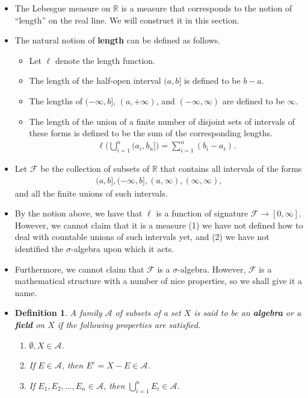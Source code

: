 \documentclass[10pt]{article}
\newtheorem{definition}[lemma]{Definition}
\newcommand{\mcal}[1]{\mathcal{#1}}
\newcommand{\Real}{\mathbb{R}}
\begin{document}
\begin{itemize}
  \item The Lebesgue measure on $\Real$ is a measure that corresponds to the notion of ``length'' on the real line. We will construct it in this section.
  
  \item The natural notion of {\bf length} can be defined as follows.
  \begin{itemize}
    \item Let $\ell$ denote the length function.
    \item The length of the half-open interval $(a,b]$ is defined to be $b - a$. 
    \item The lengths of $(-\infty, b]$, $(a, +\infty)$, and $(-\infty, \infty)$ are defined to be $\infty$.
    \item The length of the union of a finite number of disjoint sets of intervals of these forms is defined to be the sum of the corresponding lengths.
    \begin{align*}
      \ell \bigg( \bigcup_{i=1}^n (a_i, b_n] \bigg) = \sum_{i=1}^n (b_i - a_i).
    \end{align*}  
  \end{itemize}

  \item Let $\mcal{F}$ be the collection of subsets of $\Real$ that contains all intervals of the forms
  \begin{align}
    (a,b], (-\infty,b], (a,\infty), (\infty,\infty) \label{half-open-intervals-spec}, 
  \end{align} and all the finite unions of such intervals.  

  \item By the notion above, we have that $\ell$ is a function of signature $\mcal{F} \rightarrow [0,\infty]$. However, we cannot claim that it is a measure (1) we have not defined how to deal with countable unions of such intervals yet, and (2) we have not identified the $\sigma$-algebra upon which it acts.
  
  \item Furthermore, we cannot claim that $\mcal{F}$ is a $\sigma$-algebra. However, $\mcal{F}$ is a mathematical structure with a number of nice properties, so we shall give it a name.

  \item \begin{definition}
    A family $\mcal{A}$ of subsets of a set $X$ is said to be an {\bf algebra} or a {\bf field} on $X$ if the following properties are satisfied.
    \begin{enumerate}
      \item $\emptyset, X \in \mcal{A}$.
      \item If $E \in \mcal{A}$, then $E^c = X-E \in \mcal{A}$.
      \item If $E_1, E_2, \dotsc, E_n \in \mcal{A}$, then $\bigcup_{i=1}^n E_i \in \mcal{A}$.
    \end{enumerate}
  \end{definition}  
  

\end{itemize}
\end{document}
